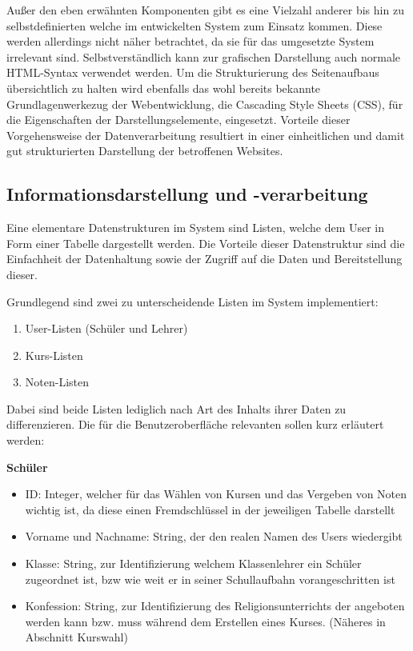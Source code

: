 Außer den eben erwähnten Komponenten gibt es eine Vielzahl anderer bis hin zu selbstdefinierten welche im entwickelten System zum Einsatz kommen. Diese werden allerdings nicht näher betrachtet, da sie für das umgesetzte System irrelevant sind. Selbstverständlich kann zur grafischen Darstellung auch normale \ac{HTML}-Syntax verwendet werden.
Um die Strukturierung des Seitenaufbaus übersichtlich zu halten wird ebenfalls das wohl bereits bekannte Grundlagenwerkezug der Webentwicklung, die \gls{Cascading Style Sheets} (CSS), für die Eigenschaften der Darstellungselemente, eingesetzt.
Vorteile dieser Vorgehensweise der Datenverarbeitung resultiert in einer einheitlichen und damit gut strukturierten Darstellung der betroffenen Websites.

\subsection{Informationsdarstellung und -verarbeitung}

Eine elementare Datenstrukturen im System sind Listen, welche dem User in Form einer Tabelle dargestellt werden.
Die Vorteile dieser Datenstruktur sind die Einfachheit der Datenhaltung sowie der Zugriff auf die Daten und Bereitstellung dieser.

Grundlegend sind zwei zu unterscheidende Listen im System implementiert:
\begin{enumerate}
  \item User-Listen (Schüler und Lehrer)
  \item Kurs-Listen
  \item Noten-Listen
\end{enumerate}

Dabei sind beide Listen lediglich nach Art des Inhalts ihrer Daten zu differenzieren. Die für die Benutzeroberfläche relevanten sollen kurz erläutert werden:

\textbf{Schüler}
\begin{itemize}
  \item ID: Integer, welcher für das Wählen von Kursen und das Vergeben von Noten wichtig ist, da diese einen Fremdschlüssel in der jeweiligen Tabelle darstellt
  \item Vorname und Nachname: String, der den realen Namen des Users wiedergibt
  \item Klasse: String, zur Identifizierung welchem Klassenlehrer ein Schüler zugeordnet ist, bzw wie weit er in seiner Schullaufbahn vorangeschritten ist
  \item Konfession: String, zur Identifizierung des Religionsunterrichts der angeboten werden kann bzw. muss während dem Erstellen eines Kurses. (Näheres in Abschnitt Kurswahl)
\end{itemize}

